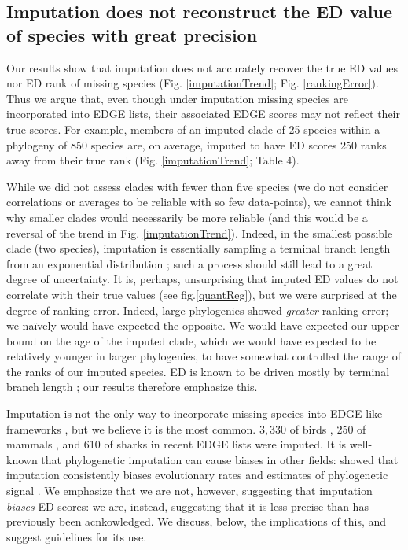 \documentclass[12pt,english]{article}
\begin{document}
\subsection*{Imputation does not reconstruct the ED value of species with great precision}
Our results show that imputation does not accurately recover the true ED values
nor ED rank of missing species (Fig. \ref{imputationTrend}; Fig.
\ref{rankingError}). Thus we argue that, even though under imputation missing
species are incorporated into EDGE lists, their associated EDGE scores may not
reflect their true scores. For example, members of an imputed clade of 25
species within a phylogeny of 850 species are, on average, imputed to have ED
scores 250 ranks away from their true rank (Fig. \ref{imputationTrend}; Table
4).

While we did not assess clades with fewer than five species (we do not consider
correlations or averages to be reliable with so few data-points), we cannot
think why smaller clades would necessarily be more reliable (and this would be a
reversal of the trend in Fig. \ref{imputationTrend}). Indeed, in the smallest
possible clade (two species), imputation is essentially sampling a terminal
branch length from an exponential distribution \autocite{Kuhn2011}; such a
process should still lead to a great degree of uncertainty. It is, perhaps,
unsurprising that imputed ED values do not correlate with their true values (see
fig.\ref{quantReg}), but we were surprised at the degree of ranking error.
Indeed, large phylogenies showed \emph{greater} ranking error; we na\"{i}vely
would have expected the opposite. We would have expected our upper bound on the
age of the imputed clade, which we would have expected to be relatively younger
in larger phylogenies, to have somewhat controlled the range of the ranks of our
imputed species. ED is known to be driven mostly by terminal branch length
\autocite{Isaac2007,Steel2007}; our results therefore emphasize this.

Imputation is not the only way to incorporate missing species into EDGE-like
frameworks \autocite{Gumbs2017, Collen2011}, but we believe it is the most
common. $3,330$ of birds \autocite[\textasciitilde30\%;][]{Jetz2014}, 250 of
mammals \autocite[\textasciitilde 5.6\%;][]{Collen2011}, and 610 of sharks
\autocite[\textasciitilde49\%;][]{Stein2018} in recent EDGE lists were imputed.
It is well-known that phylogenetic imputation can cause biases in other fields:
\textcite{Rabosky2014} showed that imputation consistently biases evolutionary
rates and estimates of phylogenetic signal \autocite{Rabosky2014}. We emphasize
that we are not, however, suggesting that imputation \emph{biases} ED scores: we
are, instead, suggesting that it is less precise than has previously been
acnkowledged. We discuss, below, the implications of this, and suggest
guidelines for its use.
\end{document}
